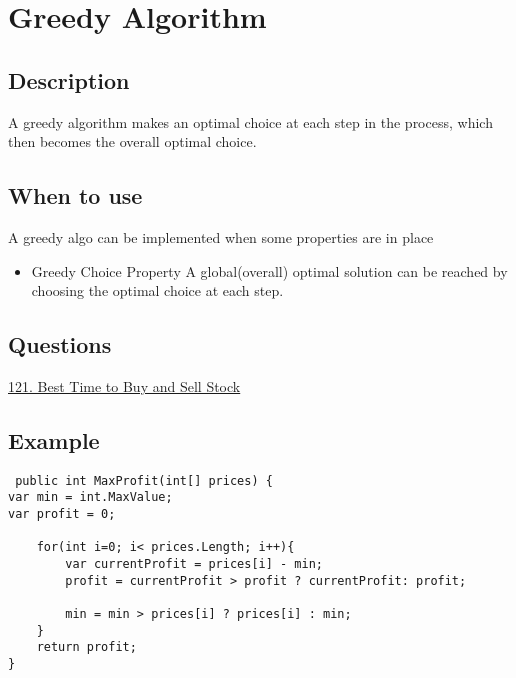 \chapter{Greedy Algorithm}

\section{Description}
A greedy algorithm makes an optimal choice at each step in the process, which then becomes the overall optimal choice.

\section{When to use}
A greedy algo can be implemented when some properties are in place
\begin{itemize}
\item Greedy Choice Property
	A global(overall) optimal solution can be reached by choosing the optimal choice at each step.
\end{itemize}

\section{Questions}

\href{https://leetcode.com/problems/best-time-to-buy-and-sell-stock/description/}{121. Best Time to Buy and Sell Stock}
 

 
\section{Example}

\begin{lstlisting}
 public int MaxProfit(int[] prices) {
var min = int.MaxValue;
var profit = 0;

    for(int i=0; i< prices.Length; i++){
        var currentProfit = prices[i] - min;
        profit = currentProfit > profit ? currentProfit: profit;

        min = min > prices[i] ? prices[i] : min;
    }
    return profit;
}
\end{lstlisting}


